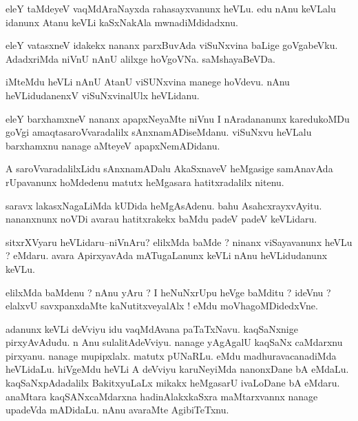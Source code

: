 \documentclass{article}
\begin{document}
\begin{mn}%
eleY taMdeyeV vaqMdAraNayxda rahasayxvanunx heVLu. edu nAnu keVLalu idanunx Atanu keVLi 
kaSxNakAla mwnadiMdidadxnu.
\end{mn}

\begin{mn}%
eleY vatasxneV idakekx nananx parxBuvAda viSuNxvina baLige goVgabeVku. AdadxriMda niVnU 
nAnU alilxge hoVgoVNa. saMshayaBeVDa.
\end{mn}

\begin{mn}%
iMteMdu heVLi nAnU AtanU viSUNxvina manege hoVdevu. nAnu heVLidudanenxV viSuNxvinalUlx 
heVLidanu.
\end{mn}

\begin{mn}%
eleY barxhamxneV nananx apapxNeyaMte niVnu I nAradananunx karedukoMDu goVgi 
amaqtasaroVvaradalilx sAnxnamADiseMdanu. viSuNxvu heVLalu barxhamxnu nanage aMteyeV 
apapxNemADidanu.
\end{mn}

\begin{mn}%
A saroVvaradalilxLidu sAnxnamADalu AkaSxnaveV heMgasige samAnavAda rUpavanunx hoMdedenu 
matutx heMgasara hatitxradalilx nitenu.
\end{mn}

\begin{mn}%
saravx lakasxNagaLiMda kUDida heMgAsAdenu. bahu AsahcxrayxvAyitu. nananxnunx noVDi avarau 
hatitxrakekx baMdu padeV padeV keVLidaru.
\end{mn}

\begin{mn}%
sitxrXVyaru heVLidaru--niVnAru? elilxMda baMde ? ninanx viSayavanunx heVLu ? eMdaru. avara 
ApirxyavAda mATugaLanunx keVLi nAnu heVLidudanunx keVLu.
\end{mn}

\begin{mn}%
elilxMda baMdenu ? nAnu yAru ? I heNuNxrUpu heVge baMditu ? ideVnu ? elalxvU savxpanxdaMte 
kaNutitxveyalAlx ! eMdu moVhagoMDidedxVne.
\end{mn}

\begin{mn}%
adanunx keVLi deVviyu idu vaqMdAvana paTaTxNavu. kaqSaNxnige pirxyAvAdudu. n Anu 
sulalitAdeVviyu. nanage yAgAgalU kaqSaNx caMdarxnu pirxyanu. nanage mupipxlalx. matutx 
pUNaRLu. eMdu madhuravacanadiMda heVLidaLu. hiVgeMdu heVLi A deVviyu karuNeyiMda 
nanonxDane bA eMdaLu. kaqSaNxpAdadalilx BakitxyuLaLx mikakx heMgasarU ivaLoDane bA eMdaru. 
anaMtara kaqSANxcaMdarxna hadinAlakxkaSxra maMtarxvannx nanage upadeVda mADidaLu. nAnu 
avaraMte AgibiTeTxnu.
\end{mn}
\end{document}
